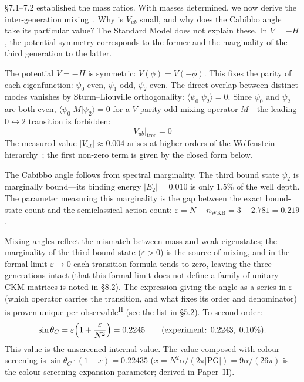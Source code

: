 \documentclass[12pt,a4paper]{article}
\newcommand{\PII}{\textsuperscript{\textup{II}}}
\begin{document}
\S7.1--7.2 established the mass ratios. With masses determined,
we now derive the inter-generation mixing~\cite{km}.
Why is $V_{ub}$ small, and why does the Cabibbo angle~\cite{cabibbo}
take its particular value?
The Standard Model does not explain these.
In $V = -H$, the potential symmetry corresponds to the former
and the marginality of the third generation to the latter.

The potential $V = -H$ is symmetric: $V(\phi) = V(-\phi)$.
This fixes the parity of each eigenfunction: $\psi_0$ even, $\psi_1$ odd, $\psi_2$ even. The direct overlap between distinct modes vanishes by Sturm--Liouville orthogonality: $\langle\psi_0|\psi_2\rangle = 0$. Since $\psi_0$ and $\psi_2$ are both even, $\langle\psi_0|M|\psi_2\rangle = 0$ for a $V$-parity-odd mixing operator $M$---the leading $0\leftrightarrow 2$ transition is forbidden:
\begin{equation}
  V_{ub}\big|_\mathrm{tree} = 0
\end{equation}
The measured value $|V_{ub}| \approx 0.004$ arises at higher orders of the Wolfenstein hierarchy~\cite{wolfenstein}; the first non-zero term is given by the closed form below.

The Cabibbo angle follows from spectral marginality.
The third bound state $\psi_2$ is marginally bound---its binding
energy $|E_2| = 0.010$ is only $1.5\%$ of the well depth.
The parameter measuring this marginality is the gap between the exact
bound-state count and the semiclassical action count:
$\varepsilon = N - n_\mathrm{WKB} = 3 - 2.781 = 0.219$.

Mixing angles reflect the mismatch between mass and weak
eigenstates; the marginality of the third bound state
($\varepsilon > 0$) is the source of mixing, and
in the formal limit $\varepsilon \to 0$ each transition formula
tends to zero, leaving the three generations intact (that this formal
limit does not define a family of unitary CKM matrices is noted in \S8.2).
The expression giving the angle as a series in $\varepsilon$ (which
operator carries the transition, and what fixes its order and
denominator) is proven unique per observable\PII{} (see the list in \S5.2).
To second order:
\begin{equation}\label{eq:cabibbo}
  \sin\theta_C = \varepsilon\Bigl(1 + \frac{\varepsilon}{N^2}\Bigr) = 0.2245   \qquad (\text{experiment: } 0.2243,\; 0.10\%).
\end{equation}
This value is the unscreened internal value. The value composed with colour screening is $\sin\theta_C \cdot (1-x) = 0.22435$ ($x = N^2\alpha/(2\pi|\mathrm{PG}|) = 9\alpha/(26\pi)$ is the colour-screening expansion parameter; derived in Paper~II).
\end{document}
